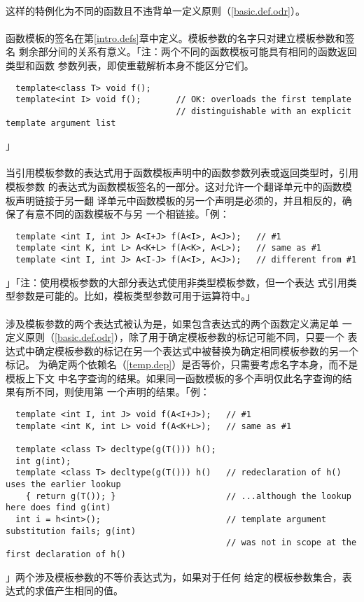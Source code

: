 \paragraph{}
这样的特例化为不同的函数且不违背单一定义原则（\ref{basic.def.odr}）。

\paragraph{}
函数模板的签名在第\ref{intro.defs}章中定义。模板参数的名字只对建立模板参数和签名
剩余部分间的关系有意义。「注：两个不同的函数模板可能具有相同的函数返回类型和函数
参数列表，即使重载解析本身不能区分它们。
\begin{lstlisting}
  template<class T> void f();
  template<int I> void f();       // OK: overloads the first template
                                  // distinguishable with an explicit template argument list
\end{lstlisting}」

\paragraph{}
当引用模板参数的表达式用于函数模板声明中的函数参数列表或返回类型时，引用模板参数
的表达式为函数模板签名的一部分。这对允许一个翻译单元中的函数模板声明链接于另一翻
译单元中函数模板的另一个声明是必须的，并且相反的，确保了有意不同的函数模板不与另
一个相链接。「例：
\begin{lstlisting}
  template <int I, int J> A<I+J> f(A<I>, A<J>);   // #1
  template <int K, int L> A<K+L> f(A<K>, A<L>);   // same as #1
  template <int I, int J> A<I-J> f(A<I>, A<J>);   // different from #1
\end{lstlisting}」「注：使用模板参数的大部分表达式使用非类型模板参数，但一个表达
式引用类型参数是可能的。比如，模板类型参数可用于运算符中。」

\paragraph{}
涉及模板参数的两个表达式被认为是，如果包含表达式的两个函数定义满足单
一定义原则（\ref{basic.def.odr}），除了用于确定模板参数的标记可能不同，只要一个
表达式中确定模板参数的标记在另一个表达式中被替换为确定相同模板参数的另一个标记。
为确定两个依赖名（\ref{temp.dep}）是否等价，只需要考虑名字本身，而不是模板上下文
中名字查询的结果。如果同一函数模板的多个声明仅此名字查询的结果有所不同，则使用第
一个声明的结果。「例：
\begin{lstlisting}
  template <int I, int J> void f(A<I+J>);   // #1
  template <int K, int L> void f(A<K+L>);   // same as #1

  template <class T> decltype(g(T())) h();
  int g(int);
  template <class T> decltype(g(T())) h()   // redeclaration of h() uses the earlier lookup
    { return g(T()); }                      // ...although the lookup here does find g(int)
  int i = h<int>();                         // template argument substitution fails; g(int)
                                            // was not in scope at the first declaration of h()
\end{lstlisting}」两个涉及模板参数的不等价表达式为，如果对于任何
给定的模板参数集合，表达式的求值产生相同的值。

